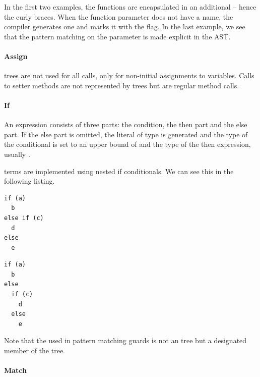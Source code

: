 In the first two examples, the functions are encapsulated in an additional  -- hence the curly braces. When the function parameter does not have a name, the compiler generates one and marks it with the \textsc{} flag. In the last example, we see that the pattern matching on the parameter is made explicit in the AST.

\paragraph{Assign} 

\noindent {} trees are not used for all \src{=} calls, only for non-initial assignments to variables. Calls to setter methods are not represented by  trees but are regular method calls.

\paragraph{If} 

\noindent An  expression consists of three parts: the condition, the then part and the else part. If the else part is omitted, the literal \src{()} of type  is generated and the type of the conditional is set to an upper bound of  and the type of the then expression, usually .

 terms are implemented using nested if conditionals. We can see this in the following listing.

\begin{multicols}{2}
\begin{lstlisting}
if (a)
  b
else if (c)
  d
else
  e

\end{lstlisting}
\begin{lstlisting}
if (a)
  b
else
  if (c)
    d
  else
    e
\end{lstlisting}
\end{multicols}

Note that the  used in pattern matching guards is not an  tree but a designated member of the  tree.

\paragraph{Match} 

